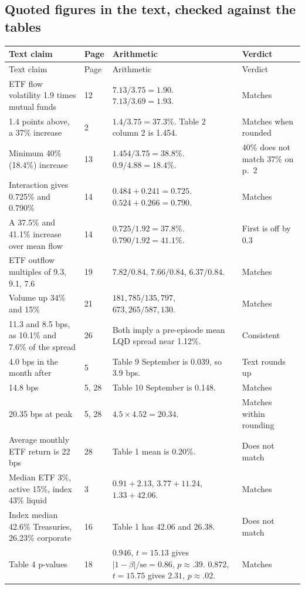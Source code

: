 \documentclass[10pt,a4paper]{article}
\begin{document}
\subsection{Quoted figures in the text, checked against the tables}
\begin{longtable}{@{}P{5.3cm}P{1.5cm}P{6.2cm}P{3.5cm}@{}}
\toprule
Text claim & Page & Arithmetic & Verdict\\
\midrule\endfirsthead
\toprule Text claim & Page & Arithmetic & Verdict\\ \midrule\endhead
ETF flow volatility 1.9 times mutual funds & 12 & $7.13/3.75=1.90$. $7.13/3.69=1.93$. & Matches\\
1.4 points above, a 37\% increase & 2 & $1.4/3.75=37.3\%$. Table 2 column 2 is 1.454. & Matches when rounded\\
Minimum 40\% (18.4\%) increase & 13 & $1.454/3.75=38.8\%$. $0.9/4.88=18.4\%$. & 40\% does not match 37\% on p.~2\\
Interaction gives 0.725\% and 0.790\% & 14 & $0.484+0.241=0.725$. $0.524+0.266=0.790$. & Matches\\
A 37.5\% and 41.1\% increase over mean flow & 14 & $0.725/1.92=37.8\%$. $0.790/1.92=41.1\%$. & First is off by 0.3\\
ETF outflow multiples of 9.3, 9.1, 7.6 & 19 & $7.82/0.84$, $7.66/0.84$, $6.37/0.84$. & Matches\\
Volume up 34\% and 15\% & 21 & $181{,}785/135{,}797$, $673{,}265/587{,}130$. & Matches\\
11.3 and 8.5 bps, as 10.1\% and 7.6\% of the spread & 26 & Both imply a pre-episode mean LQD spread near 1.12\%. & Consistent\\
4.0 bps in the month after & 5 & Table 9 September is 0.039, so 3.9 bps. & Text rounds up\\
14.8 bps & 5, 28 & Table 10 September is 0.148. & Matches\\
20.35 bps at peak & 5, 28 & $4.5\times 4.52=20.34$. & Matches within rounding\\
Average monthly ETF return is 22 bps & 28 & Table 1 mean is 0.20\%. & Does not match\\
Median ETF 3\%, active 15\%, index 43\% liquid & 3 & $0.91+2.13$, $3.77+11.24$, $1.33+42.06$. & Matches\\
Index median 42.6\% Treasuries, 26.23\% corporate & 16 & Table 1 has 42.06 and 26.38. & Does not match\\
Table 4 p-values & 18 & $0.946$, $t=15.13$ gives $|1-\beta|/\mathrm{se}=0.86$, $p\approx.39$. $0.872$, $t=15.75$ gives $2.31$, $p\approx.02$. & Matches\\
\bottomrule
\end{longtable}
\end{document}
